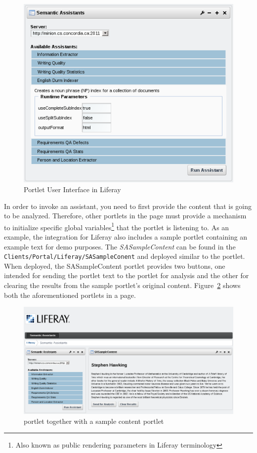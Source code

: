 \begin{figure}
\centering
\includegraphics[scale=0.7]{pictures/liferay_sa_portlet.png}
\caption{\sa Portlet User Interface in Liferay}
\label{fig:liferay_sa_portlet}
\end{figure}

\blankline

In order to invoke an assistant, you need to first provide the content that is going to be analyzed. Therefore, other portlets in the page must provide a mechanism to initialize specific global variables\footnote{Also known as public rendering parameters in Liferay terminology} that the \sa portlet is listening to. As an example, the \sa integration for Liferay also includes a sample portlet containing an example text for demo purposes. The \emph{SASampleContent} can be found in the \texttt{Clients/Portal/Liferay/SASampleConent} and deployed similar to the \sa portlet. When deployed, the SASampleContent portlet provides two buttons, one intended for sending the portlet text to the \sa portlet for analysis and the other for clearing the results from the sample portlet's original content. Figure~\ref{fig:liferay_both_portlets} shows both the aforementioned portlets in a page.

\begin{figure}
\centering
\includegraphics[scale=0.6]{pictures/liferay_both_portlets.png}
\caption{\sa portlet together with a sample content portlet}
\label{fig:liferay_both_portlets}
\end{figure}

